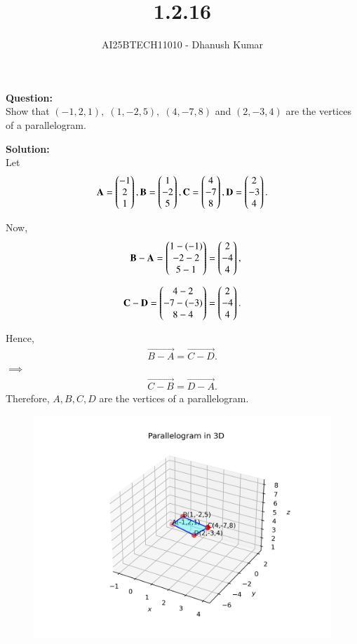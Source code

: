 \documentclass[journal]{IEEEtran}
\begin{document}
\title{
1.2.16}
\author{AI25BTECH11010 - Dhanush Kumar}
\maketitle
\renewcommand{\thefigure}{\theenumi}
\renewcommand{\thetable}{\theenumi}


\noindent
\textbf{Question:} \\
Show that $(-1,2,1), \; (1,-2,5), \; (4,-7,8)$ and $(2,-3,4)$ are the vertices of a parallelogram.

\bigskip
\textbf{Solution:} \\
Let
\begin{align}
	\mathbf{A} = \begin{pmatrix}-1 \\ 2 \\ 1\end{pmatrix},
	\mathbf{B}= \begin{pmatrix}1 \\ -2 \\ 5\end{pmatrix}, 
\mathbf{C} = \begin{pmatrix}4 \\ -7 \\ 8\end{pmatrix},
\mathbf{D} = \begin{pmatrix}2 \\ -3 \\ 4\end{pmatrix}.
\end{align}

Now,
\begin{align}
	\mathbf{B - A}= \begin{pmatrix}1 - (-1) \\ -2 - 2 \\ 5 - 1\end{pmatrix}
      = \begin{pmatrix}2 \\ -4 \\ 4\end{pmatrix}, \\[6pt]
	\mathbf{C - D} = \begin{pmatrix}4 - 2 \\ -7 - (-3) \\ 8 - 4\end{pmatrix}
      = \begin{pmatrix}2 \\ -4 \\ 4\end{pmatrix}.
\end{align}

Hence,
\begin{align}
	\vec{B - A} = \vec{C - D}.
\end{align}
$\implies$ 
\begin{align}
	\vec{C-B} = \vec{D -A} .
\end{align}
Therefore, $A, B, C, D$ are the vertices of a parallelogram.

\begin{figure}[H]
    \centering
	\includegraphics[width=1\textwidth]{img.png}
	    \caption{}
    \label{img}
    \end{figure}
\end{document}
